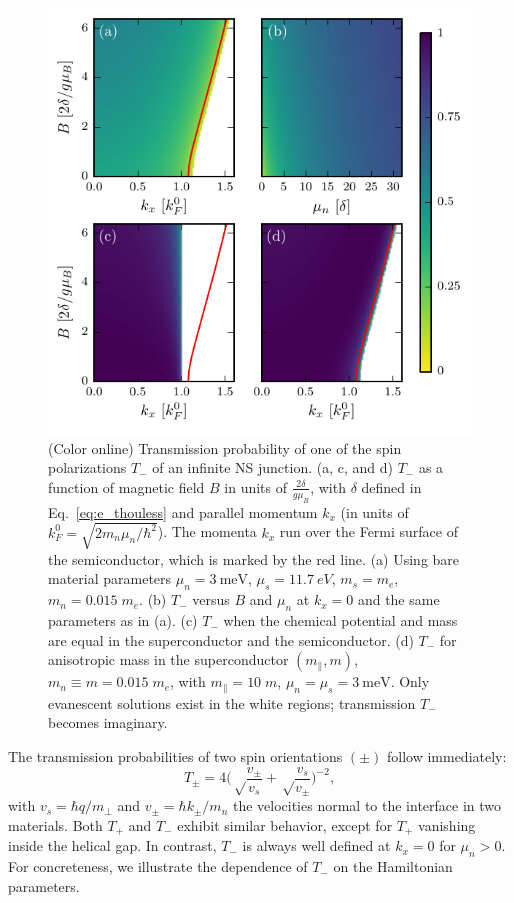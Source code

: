 \begin{figure}[t]
\includegraphics[width=\columnwidth]{chapter_shortjunction/figures/transparency}
\caption{(Color online)
Transmission probability of one of the spin polarizations $T_-$ of an infinite NS junction.
(a, c, and d) $T_-$ as a function of magnetic field $B$ in units of $\frac{2\delta}{g\mu_B}$, with $\delta$ defined in Eq.~\eqref{eq:e_thouless} and parallel momentum $k_x$ (in units of $k_F^0=\sqrt{2m_n\mu_n/\hbar^2}$).
The momenta $k_x$ run over the Fermi surface of the semiconductor, which is marked by the red line.
(a) Using bare material parameters $\mu_n=\SI{3}{\meV}$, $\mu_s=\SI{11.7}{eV}$, $m_s=m_e$, $m_n=0.015\;m_e$.
(b) $T_-$ versus $B$ and $\mu_n$ at $k_x=0$ and the same parameters as in (a).
(c) $T_-$ when the chemical potential and mass are equal in the superconductor and the semiconductor.
(d) $T_-$ for anisotropic mass in the superconductor $(m_\parallel, m)$, $m_n\equiv m=0.015\;m_e$, with $m_\parallel=10\;m$, $\mu_n=\mu_s=\SI{3}{\meV}$.
Only evanescent solutions exist in the white regions; transmission $T_-$ becomes imaginary.
}
\label{fig:transp}
\end{figure}

The transmission probabilities of two spin orientations $(\pm)$ follow immediately:
\begin{equation}
T_\pm=4
\bigg(\sqrt\frac{v_\pm}{v_s}+\sqrt\frac{v_s}{v_\pm}\bigg)^{-2},
\end{equation}
with $v_s=\hbar q/m_\perp$ and $v_\pm=\hbar k_\pm/m_n$ the velocities normal to the interface in two materials.
Both $T_+$ and $T_-$ exhibit similar behavior, except for $T_+$ vanishing inside the helical gap.
In contrast, $T_-$ is always well defined at $k_x=0$ for $\mu_n>0$.
For concreteness, we illustrate the dependence of $T_-$ on the Hamiltonian parameters.

